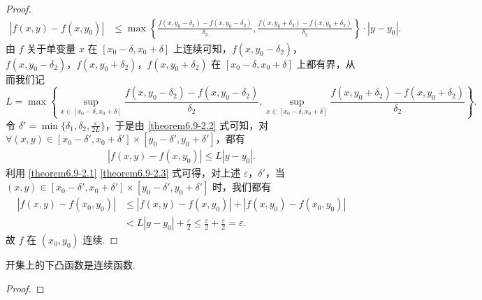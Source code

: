 \documentclass[lang=cn,newtx,10pt,scheme=chinese]{elegantbook}
\begin{document}
\begin{proof}
\begin{align}
|f(x,y) - f(x,y_0)| &\leqslant \max\left\{\frac{f(x,y_0 - \delta_2) - f(x,y_0 - \delta_2)}{\delta_2},\frac{f(x,y_0 + \delta_2) - f(x,y_0 + \delta_2)}{\delta_2}\right\}\cdot|y - y_0|. \label{theorem6.9-2.2}
\end{align}
由 \(f\) 关于单变量 \(x\) 在 \([x_0 - \delta, x_0 + \delta]\) 上连续可知，\(f(x,y_0 - \delta_2)\)，\(f(x,y_0 - \delta_2)\)，\(f(x,y_0 + \delta_2)\)，\(f(x,y_0 + \delta_2)\) 在 \([x_0 - \delta, x_0 + \delta]\) 上都有界，从而我们记 \[L = \max\left\{\sup_{x\in [x_0 - \delta, x_0 + \delta]}\frac{f(x,y_0 - \delta_2) - f(x,y_0 - \delta_2)}{\delta_2},\sup_{x\in [x_0 - \delta, x_0 + \delta]}\frac{f(x,y_0 + \delta_2) - f(x,y_0 + \delta_2)}{\delta_2}\right\}.\]令 \(\delta' = \min\{\delta_1,\delta_2,\frac{\varepsilon}{2L}\}\)，于是由 \eqref{theorem6.9-2.2} 式可知，对 \(\forall (x,y)\in [x_0 - \delta', x_0 + \delta']\times[y_0 - \delta', y_0 + \delta']\)，都有
\begin{align}
|f(x,y) - f(x,y_0)| \leqslant L|y - y_0|. \label{theorem6.9-2.3}
\end{align}
利用 \eqref{theorem6.9-2.1} \eqref{theorem6.9-2.3} 式可得，对上述 \(\varepsilon\)，\(\delta'\)，当 \((x,y)\in [x_0 - \delta', x_0 + \delta']\times[y_0 - \delta', y_0 + \delta']\) 时，我们都有
\begin{align*}
|f(x,y) - f(x_0,y_0)| &\leqslant |f(x,y) - f(x,y_0)|+|f(x,y_0) - f(x_0,y_0)| \\
&< L|y - y_0|+\frac{\varepsilon}{2} 
\leqslant \frac{\varepsilon}{2}+\frac{\varepsilon}{2}=\varepsilon.
\end{align*}
故 \(f\) 在 \((x_0,y_0)\) 连续.
\end{proof}

\begin{corollary}[开集上的下凸函数必连续]\label{corollary:开集上的下凸函数必连续}
开集上的下凸函数是连续函数.
\end{corollary}
\begin{proof}

\end{proof}
\end{document}
